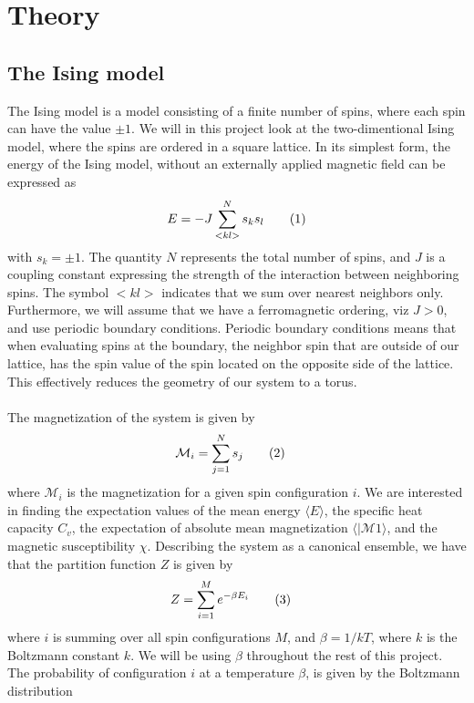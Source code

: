 \documentclass{article}
\newcommand\numberthis{\addtocounter{equation}{1}\tag{\theequation}}
\begin{document}
\section{Theory}
\subsection{The Ising model}
The Ising model is a model consisting of a finite number of spins, where each spin can have the value $\pm1$. We will in this project look at the two-dimentional Ising model, where the spins are ordered in a square lattice. In its simplest form, the energy of the Ising model, without an externally applied magnetic field can be expressed as
\begin{align*}
  E = -J\sum\limits_{<kl>}^Ns_ks_l \numberthis\label{eq:energy}
\end{align*}
with $s_k =\pm 1$. The quantity $N$ represents the total number of spins, and $J$ is a coupling constant expressing the strength of the interaction between neighboring spins. The symbol $<kl>$ indicates that we sum over nearest neighbors only. Furthermore, we will assume that we have a ferromagnetic ordering, viz $J>0$, and use periodic boundary conditions. Periodic boundary conditions means that when evaluating spins at the boundary, the neighbor spin that are outside of our lattice, has the spin value of the spin located on the opposite side of the lattice. This effectively reduces the geometry of our system to a torus.\\\\
The magnetization of the system is given by
\begin{align*}
  \mathcal{M}_i &= \sum\limits_{j=1}^N s_j \numberthis\label{eq:magnetization}
\end{align*}
where $\mathcal{M}_i$ is the magnetization for a given spin configuration $i$. We are interested in finding the expectation values of the mean energy $\langle E\rangle$, the specific heat capacity $C_v$, the expectation of absolute mean magnetization $\langle |\mathcal{M}1\rangle$, and the magnetic susceptibility $\chi$. Describing the system as a canonical ensemble, we have that the partition function $Z$ is given by
\begin{align*}
  Z &= \sum\limits_{i=1}^Me^{-\beta E_i}\numberthis\label{eq:partition}
\end{align*}
where $i$ is summing over all spin configurations $M$, and $\beta = 1/kT$, where $k$ is the Boltzmann constant $k$. We will be using $\beta$ throughout the rest of this project. The probability of configuration $i$ at a temperature $\beta$, is given by the Boltzmann distribution
\end{document}

